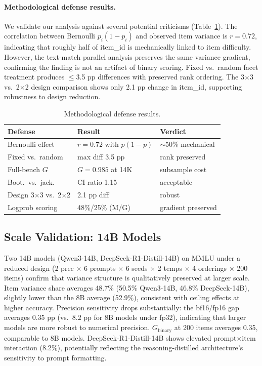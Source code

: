 \documentclass[letterpaper,11pt]{article}
\begin{document}
\paragraph{Methodological defense results.}
We validate our analysis against several potential criticisms (Table~\ref{tab:defense}).
The correlation between Bernoulli $p_i(1-p_i)$ and observed item variance is $r=0.72$, indicating that roughly half of item\_id is mechanically linked to item difficulty.
However, the text-match parallel analysis preserves the same variance gradient, confirming the finding is not an artifact of binary scoring.
Fixed vs.\ random facet treatment produces $\leq$3.5 pp differences with preserved rank ordering.
The 3$\times$3 vs.\ 2$\times$2 design comparison shows only 2.1 pp change in item\_id, supporting robustness to design reduction.

\begin{table}[t]
\centering
\caption{Methodological defense results.}
\label{tab:defense}
\small
\begin{tabular}{@{}p{2.8cm} p{2.6cm} l@{}}
\toprule
Defense & Result & Verdict \\
\midrule
Bernoulli effect    & $r{=}0.72$ with $p(1{-}p)$   & $\sim$50\% mechanical \\
Fixed vs.\ random   & max diff 3.5 pp          & rank preserved \\
Full-bench $G$      & $G{=}0.985$ at 14K       & subsample cost \\
Boot.\ vs.\ jack.   & CI ratio 1.15            & acceptable \\
Design 3$\times$3 vs.\ 2$\times$2 & 2.1 pp diff & robust \\
Logprob scoring     & 48\%/25\% (M/G)          & gradient preserved \\
\bottomrule
\end{tabular}
\end{table}

\subsection{Scale Validation: 14B Models}
\label{sec:scale}

Two 14B models (Qwen3-14B, DeepSeek-R1-Distill-14B) on MMLU under a reduced design (2 prec $\times$ 6 prompts $\times$ 6 seeds $\times$ 2 temps $\times$ 4 orderings $\times$ 200 items) confirm that variance structure is qualitatively preserved at larger scale.
Item variance share averages 48.7\% (50.5\% Qwen3-14B, 46.8\% DeepSeek-14B), slightly lower than the 8B average (52.9\%), consistent with ceiling effects at higher accuracy.
Precision sensitivity drops substantially: the bf16/fp16 gap averages 0.35 pp (vs.\ 8.2 pp for 8B models under fp32), indicating that larger models are more robust to numerical precision.
$G_\text{binary}$ at 200 items averages 0.35, comparable to 8B models.
DeepSeek-R1-Distill-14B shows elevated prompt$\times$item interaction (8.2\%), potentially reflecting the reasoning-distilled architecture's sensitivity to prompt formatting.
\end{document}
